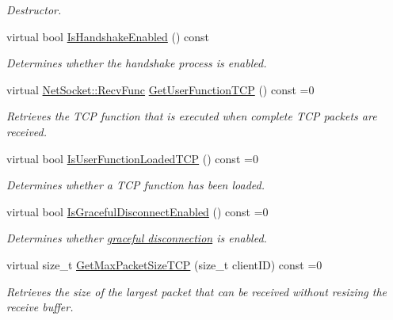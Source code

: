 \begin{DoxyCompactItemize}
\begin{DoxyCompactList}\small\item\em Destructor. \item\end{DoxyCompactList}\item 
virtual bool \hyperlink{class_net_instance_t_c_p_a4647a2f2953f2556c4be24e23a0a6f5c}{IsHandshakeEnabled} () const 
\begin{DoxyCompactList}\small\item\em Determines whether the handshake process is enabled. \item\end{DoxyCompactList}\item 
virtual \hyperlink{class_net_socket_a52b5f4de8d0a47fd8620f542b21c076c}{NetSocket::RecvFunc} \hyperlink{class_net_instance_t_c_p_a8dfdf67081405105b691c15cc867725d}{GetUserFunctionTCP} () const =0
\begin{DoxyCompactList}\small\item\em Retrieves the TCP function that is executed when complete TCP packets are received. \item\end{DoxyCompactList}\item 
virtual bool \hyperlink{class_net_instance_t_c_p_ad1e427866c1a3703a224131c2d46fa9d}{IsUserFunctionLoadedTCP} () const =0
\begin{DoxyCompactList}\small\item\em Determines whether a TCP function has been loaded. \item\end{DoxyCompactList}\item 
virtual bool \hyperlink{class_net_instance_t_c_p_aae7db49f79eaf1fd5359c084e893f946}{IsGracefulDisconnectEnabled} () const =0
\begin{DoxyCompactList}\small\item\em Determines whether \hyperlink{graceful_disconnect_page}{graceful disconnection} is enabled. \item\end{DoxyCompactList}\item 
virtual size\_\-t \hyperlink{class_net_instance_t_c_p_acd2529df4ee98a7b2ca144a60feb1bb2}{GetMaxPacketSizeTCP} (size\_\-t clientID) const =0
\begin{DoxyCompactList}\small\item\em Retrieves the size of the largest packet that can be received without resizing the receive buffer. \item\end{DoxyCompactList}\item 

\end{DoxyCompactItemize}
